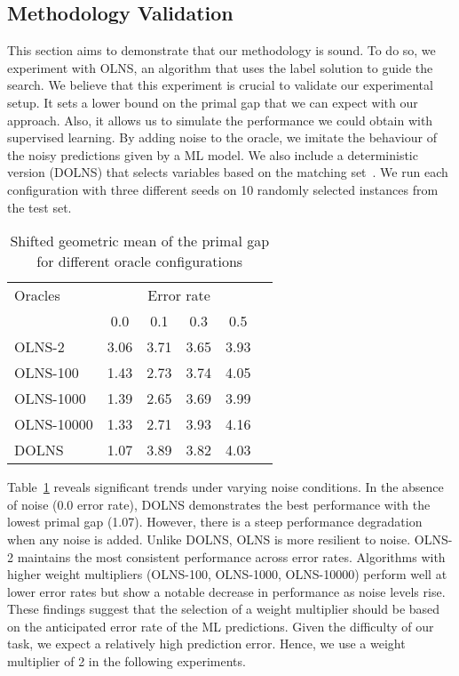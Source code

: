\documentclass[3p, authoryear, times]{elsarticle}
\begin{document}
\subsection{Methodology Validation}\label{sec:lns:methodology_validation} 
This section aims to demonstrate that our methodology is sound. To do so, we experiment with OLNS, an algorithm that uses the label solution to guide the search. We believe that this experiment is crucial to validate our experimental setup. It sets a lower bound on the primal gap that we can expect with our approach. Also, it allows us to simulate the performance we could obtain with supervised learning. By adding noise to the oracle, we imitate the behaviour of the noisy predictions given by a ML model. We also include a deterministic version (DOLNS) that selects variables based on the matching set~. We run each configuration with three different seeds on 10 randomly selected instances from the test set. 

\begin{table}[h]
\centering
\caption{Shifted geometric mean of the primal gap for different oracle configurations}
\label{tab:oracle_error_rates}
\begin{tabular}{lccccc}
\toprule
{Oracles} & \multicolumn{4}{c}{Error rate} \\
{} & {0.0} & {0.1} & {0.3} & {0.5} \\
\midrule
OLNS-2 & 3.06 & 3.71 & 3.65 & 3.93 \\
OLNS-100 & 1.43 & 2.73 & 3.74 & 4.05 \\
OLNS-1000 & 1.39 & 2.65 & 3.69 & 3.99 \\
OLNS-10000 & 1.33 & 2.71 & 3.93 & 4.16 \\
DOLNS & 1.07 & 3.89 & 3.82 & 4.03 \\
\bottomrule
\end{tabular}
\end{table}




Table~\ref{tab:oracle_error_rates} reveals significant trends under varying noise conditions. In the absence of noise (0.0 error rate), DOLNS demonstrates the best performance with the lowest primal gap (1.07). However, there is a steep performance degradation when any noise is added. Unlike DOLNS, OLNS is more resilient to noise. OLNS-2 maintains the most consistent performance across error rates. Algorithms with higher weight multipliers (OLNS-100, OLNS-1000, OLNS-10000) perform well at lower error rates but show a notable decrease in performance as noise levels rise. These findings suggest that the selection of a weight multiplier should be based on the anticipated error rate of the ML predictions. Given the difficulty of our task, we expect a relatively high prediction error. Hence, we use a weight multiplier of 2 in the following experiments. 
\end{document}
